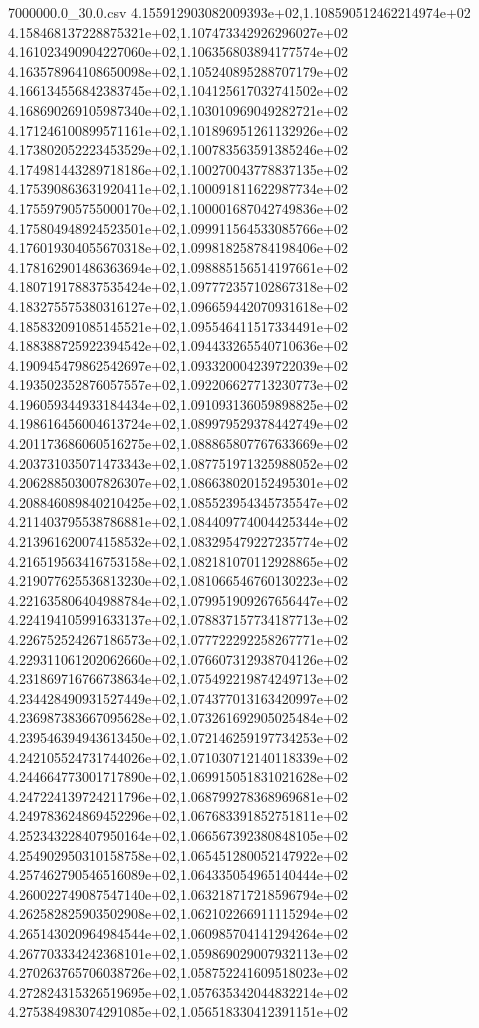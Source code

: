 \begin{filecontents*}{7000000.0_30.0.csv}
4.155912903082009393e+02,1.108590512462214974e+02
4.158468137228875321e+02,1.107473342926296027e+02
4.161023490904227060e+02,1.106356803894177574e+02
4.163578964108650098e+02,1.105240895288707179e+02
4.166134556842383745e+02,1.104125617032741502e+02
4.168690269105987340e+02,1.103010969049282721e+02
4.171246100899571161e+02,1.101896951261132926e+02
4.173802052223453529e+02,1.100783563591385246e+02
4.174981443289718186e+02,1.100270043778837135e+02
4.175390863631920411e+02,1.100091811622987734e+02
4.175597905755000170e+02,1.100001687042749836e+02
4.175804948924523501e+02,1.099911564533085766e+02
4.176019304055670318e+02,1.099818258784198406e+02
4.178162901486363694e+02,1.098885156514197661e+02
4.180719178837535424e+02,1.097772357102867318e+02
4.183275575380316127e+02,1.096659442070931618e+02
4.185832091085145521e+02,1.095546411517334491e+02
4.188388725922394542e+02,1.094433265540710636e+02
4.190945479862542697e+02,1.093320004239722039e+02
4.193502352876057557e+02,1.092206627713230773e+02
4.196059344933184434e+02,1.091093136059898825e+02
4.198616456004613724e+02,1.089979529378442749e+02
4.201173686060516275e+02,1.088865807767633669e+02
4.203731035071473343e+02,1.087751971325988052e+02
4.206288503007826307e+02,1.086638020152495301e+02
4.208846089840210425e+02,1.085523954345735547e+02
4.211403795538786881e+02,1.084409774004425344e+02
4.213961620074158532e+02,1.083295479227235774e+02
4.216519563416753158e+02,1.082181070112928865e+02
4.219077625536813230e+02,1.081066546760130223e+02
4.221635806404988784e+02,1.079951909267656447e+02
4.224194105991633137e+02,1.078837157734187713e+02
4.226752524267186573e+02,1.077722292258267771e+02
4.229311061202062660e+02,1.076607312938704126e+02
4.231869716766738634e+02,1.075492219874249713e+02
4.234428490931527449e+02,1.074377013163420997e+02
4.236987383667095628e+02,1.073261692905025484e+02
4.239546394943613450e+02,1.072146259197734253e+02
4.242105524731744026e+02,1.071030712140118339e+02
4.244664773001717890e+02,1.069915051831021628e+02
4.247224139724211796e+02,1.068799278368969681e+02
4.249783624869452296e+02,1.067683391852751811e+02
4.252343228407950164e+02,1.066567392380848105e+02
4.254902950310158758e+02,1.065451280052147922e+02
4.257462790546516089e+02,1.064335054965140444e+02
4.260022749087547140e+02,1.063218717218596794e+02
4.262582825903502908e+02,1.062102266911115294e+02
4.265143020964984544e+02,1.060985704141294264e+02
4.267703334242368101e+02,1.059869029007932113e+02
4.270263765706038726e+02,1.058752241609518023e+02
4.272824315326519695e+02,1.057635342044832214e+02
4.275384983074291085e+02,1.056518330412391151e+02

\end{filecontents*}
